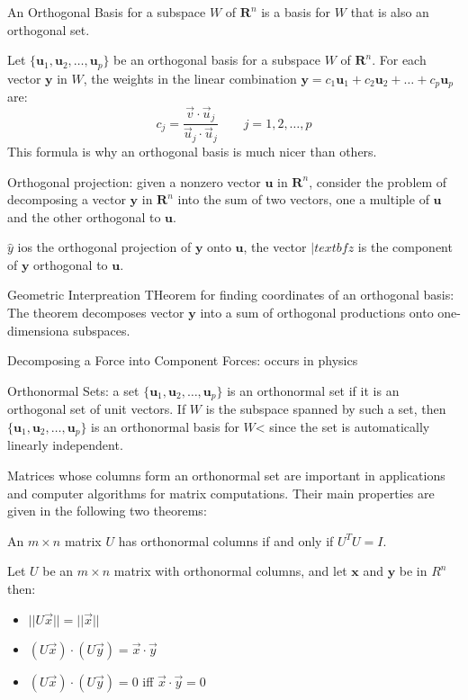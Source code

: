 \documentclass[../linalg.tex]{subfiles}
\begin{document}
\begin{definition}
    An Orthogonal Basis for a subspace $W$ of $\textbf{R}^n$ is a basis for $W$ that is also an orthogonal set.
\end{definition}

\begin{theorem}
    Let $\{\textbf{u}_1,\textbf{u}_2,\dots,\textbf{u}_p\}$ be an orthogonal basis for a subspace $W$ of $\textbf{R}^n$. For each vector $\textbf{y}$ in $W$, the weights in the linear combination 
    $\textbf{y}=c_1\textbf{u}_1+c_2\textbf{u}_2+\dots + c_p\textbf{u}_p$ are: 
    \[ c_j = \frac{\vec{v}\cdot \vec{u}_j}{\vec{u}_j\cdot \vec{u}_j} \qquad j=1,2,\dots,p \]
    This formula is why an orthogonal basis is much nicer than others.
\end{theorem}

Orthogonal projection: given a nonzero vector $\textbf{u}$ in $\textbf{R}^n$, consider the problem of decomposing a vector $\textbf{y}$ in $\textbf{R}^n$ into the sum of two vectors, one a multiple of $\textbf{u}$ and the other orthogonal to $\textbf{u}$.

$\hat{y}$ ios the orthogonal projection of $\textbf{y}$ onto $\textbf{u}$, the vector $|textbf{z}$ is the component of $\textbf{y}$ orthogonal to $\textbf{u}$.

Geometric Interpreation THeorem for finding coordinates of an orthogonal basis: The theorem decomposes vector $\textbf{y}$ into a sum of orthogonal productions onto one-dimensiona subspaces.

Decomposing a Force into Component Forces: occurs in physics 

Orthonormal Sets: a set $\{\textbf{u}_1,\textbf{u}_2,\dots,\textbf{u}_p\}$ is an orthonormal set if it is an orthogonal set of unit vectors. If $W$ is the subspace spanned by such a set, then 
$\{\textbf{u}_1,\textbf{u}_2,\dots,\textbf{u}_p\}$ is an orthonormal basis for $W$< since the set is automatically linearly independent.

Matrices whose columns form an orthonormal set are important in applications and computer algorithms for matrix computations. Their main properties are given in the following two theorems:
\begin{theorem}
    An $m\times n$ matrix $U$ has orthonormal columns if and only if $U^T U=I$.
\end{theorem}

\begin{theorem}
    Let $U$ be an $m\times n$ matrix with orthonormal columns, and let $\textbf{x}$ and $\textbf{y}$ be in $R^n$ then:
    \begin{itemize}
        \item $||U\vec{x}||=||\vec{x}||$
        \item $(U\vec{x})\cdot (U\vec{y})=\vec{x}\cdot \vec{y}$
        \item $(U\vec{x})\cdot (U\vec{y})=0$ iff $\vec{x}\cdot \vec{y}=0$
    \end{itemize}
\end{theorem}
\end{document}
